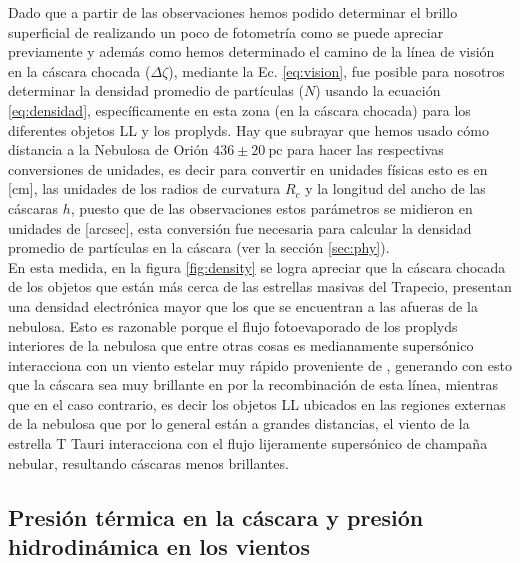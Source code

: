 Dado que a partir de las observaciones hemos podido determinar el brillo superficial de \ha{} realizando un poco de fotometría como se puede apreciar previamente y además como hemos determinado el camino de la línea de visión en la cáscara chocada (\(\Delta\zeta\)), mediante la Ec. \ref{eq:vision}, fue posible para nosotros determinar la densidad promedio de partículas (\(N\)) usando la ecuación \ref{eq:densidad}, específicamente en esta zona (en la cáscara chocada) para los diferentes objetos LL y los proplyds. Hay que subrayar que hemos usado cómo distancia a la Nebulosa de Orión \(436 \pm 20~\text{pc}\) \citep{Odell:2008} para hacer las respectivas conversiones de unidades, es decir para convertir en unidades físicas esto es en [cm], las unidades de los radios de curvatura \(R_{c}\) y la longitud del ancho de las cáscaras \(h\), puesto que de las observaciones estos parámetros se midieron en unidades de [arcsec], esta conversión fue necesaria para calcular la densidad promedio de partículas en la cáscara (ver la sección \ref{sec:phy}).\\

En esta medida, en la figura \ref{fig:density} se logra apreciar que la cáscara chocada de los objetos que están más cerca de las estrellas masivas del Trapecio, presentan una densidad electrónica mayor que los que se encuentran a las afueras de la nebulosa. Esto es razonable porque el flujo fotoevaporado de los proplyds interiores de la nebulosa que entre otras cosas es medianamente supersónico interacciona con un viento estelar muy rápido proveniente de \thC{}, generando con esto que la cáscara sea muy brillante en \ha{} por la recombinación de esta línea, mientras que en el caso contrario, es decir los objetos LL  ubicados en las regiones externas de la nebulosa que por lo general están a grandes distancias, el viento de la estrella T Tauri interacciona con el flujo lijeramente supersónico de champaña nebular, resultando cáscaras menos brillantes.
  
\subsection{Presión térmica en la cáscara y  presión hidrodinámica en los vientos }
\label{sec:pressure}

